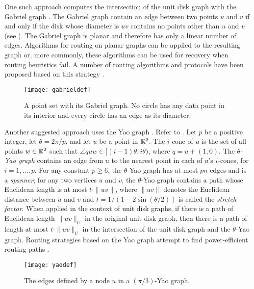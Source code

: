 \documentclass[lotsofwhite,charterfonts]{patmorin}
\begin{document}
One such approach computes the intersection of the unit disk graph with
the Gabriel graph \cite{gs69}.  The Gabriel graph contain an edge between
two points $u$ and $v$ if and only if the disk whose diameter is $uv$
contains no points other than $u$ and $v$ (see ).  The
Gabriel graph is planar and therefore has only a linear number of edges.
Algorithms for routing on planar graphs can be applied to the resulting
graph or, more commonly, these algorithms can be used for recovery when
routing heuristics fail.  A number of routing algorithms and protocols
have been proposed based on this strategy \cite{bfno03,bmsu01,kk00}.

\begin{figure}
\begin{center}{\texttt{[image: gabrieldef]}}\end{center}
\caption{A point set with its Gabriel graph. No circle has
any data point in its interior and every circle has an edge
as its diameter.}
\end{figure}

Another suggested approach uses the Yao graph \cite{y82}. Refer to
. Let $p$ be a positive integer, let $\theta=2\pi/p$,
and let $u$ be a point in $\mathbb{R}^2$.  The $i$-cone of $u$ is the set of all
points $w\in\mathbb{R}^2$ such that $\angle quw \in [(i-1)\theta,i\theta)$, where
$q = u+(1,0)$.  The \emph{$\theta$-Yao graph} contains an edge from $u$
to the nearest point in each of $u$'s $i$-cones, for $i=1,\ldots,p$.
For any constant $p\ge 6$, the $\theta$-Yao graph has at most $pn$
edges and is a \emph{spanner}; for any two vertices $u$ and $v$, the
$\theta$-Yao graph contains a path whose Euclidean length is at most
$t\cdot\|uv\|$, where $\|uv\|$ denotes the Euclidean distance between $u$
and $v$ and $t=1/(1-2\sin(\theta/2))$ is called the \emph{stretch factor}.
When applied in the context of unit disk graphs, if there is a path of
Euclidean length $\|uv\|_U$ in the original unit disk graph, then there
is a path of length at most $t\cdot\|uv\|_U$ in the intersection of
the unit disk graph and the $\theta$-Yao graph.  Routing strategies
based on the Yao graph attempt to find power-efficient routing paths
\cite{glsv02,lwy01,wlbw01,svz07}.

\begin{figure}
\begin{center}{\texttt{[image: yaodef]}}\end{center}
\caption{The edges defined by a node $u$ in a $(\pi/3)$-Yao graph.}
\end{figure}
\end{document}
